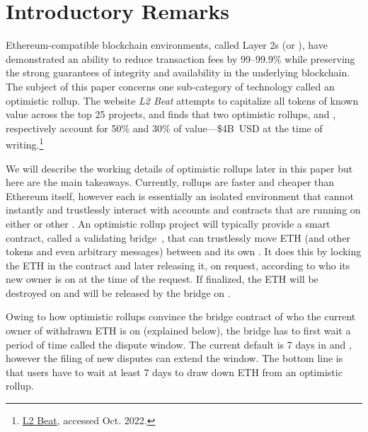 \section{Introductory Remarks}

Ethereum-compatible blockchain environments, called Layer 2s (or \layertwos), have demonstrated an ability to reduce transaction fees by 99--99.9\% while preserving the strong guarantees of integrity and availability in the underlying blockchain. The subject of this paper concerns one sub-category of \layertwo technology called an optimistic rollup. The website \textit{L2 Beat} attempts to capitalize all tokens of known value across the top 25 \layertwo projects, and finds that two optimistic rollups, \arb and \opt, respectively account for 50\% and 30\% of \layertwo value---\$4B~USD at the time of writing.\footnote{\href{https://l2beat.com/scaling/tvl/}{L2 Beat}, accessed Oct. 2022.}

We will describe the working details of optimistic rollups later in this paper but here are the main takeaways. Currently, rollups are faster and cheaper than Ethereum itself, however each \layertwo is essentially an isolated environment that cannot instantly and trustlessly interact with accounts and contracts that are running on either \layerone or other \layertwos. An optimistic rollup project will typically provide a smart contract, called a validating bridge~\cite{mccorry2021sok}, that can trustlessly move ETH (and other tokens and even arbitrary messages) between \layerone and its own \layertwo. It does this by locking the ETH in the \layerone contract and later releasing it, on request, according to who its new owner is on \layertwo at the time of the request. If finalized, the ETH will be destroyed on \layertwo and will be released by the bridge on \layerone.

Owing to how optimistic rollups convince the \layerone bridge contract of who the current owner of withdrawn ETH is on \layertwo (explained below), the bridge has to first wait a period of time called the dispute window. The current default is 7 days in \arb and \opt, however the filing of new disputes can extend the window. The bottom line is that users have to wait at least 7 days to draw down ETH from an optimistic rollup. 


